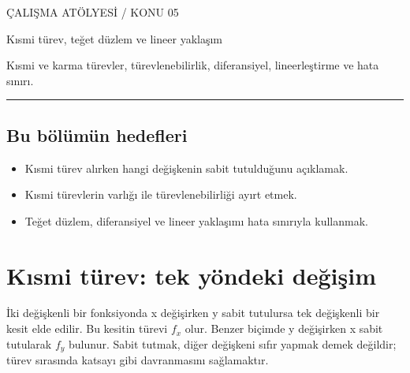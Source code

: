 
{\sffamily\small\color{accent} ÇALIŞMA ATÖLYESİ / KONU 05\par}
\vspace{8mm}
{\Huge\sffamily\bfseries\raggedright{} Kısmi türev, teğet düzlem ve lineer yaklaşım\par}
\vspace{3mm}
{\large Kısmi ve karma türevler, türevlenebilirlik, diferansiyel, lineerleştirme ve hata sınırı.\par}
\vspace{4mm}\hrule\vspace{4mm}\subsection*{Bu bölümün hedefleri}\begin{itemize}
\item Kısmi türev alırken hangi değişkenin sabit tutulduğunu açıklamak.
\item Kısmi türevlerin varlığı ile türevlenebilirliği ayırt etmek.
\item Teğet düzlem, diferansiyel ve lineer yaklaşımı hata sınırıyla kullanmak.\end{itemize}
{\small\tableofcontents}\clearpage
\section{Kısmi türev: tek yöndeki değişim}
İki değişkenli bir fonksiyonda x değişirken y sabit tutulursa tek değişkenli bir kesit elde edilir. Bu kesitin türevi \(f_x\) olur. Benzer biçimde y değişirken x sabit tutularak \(f_y\) bulunur. Sabit tutmak, diğer değişkeni sıfır yapmak demek değildir; türev sırasında katsayı gibi davranmasını sağlamaktır.


